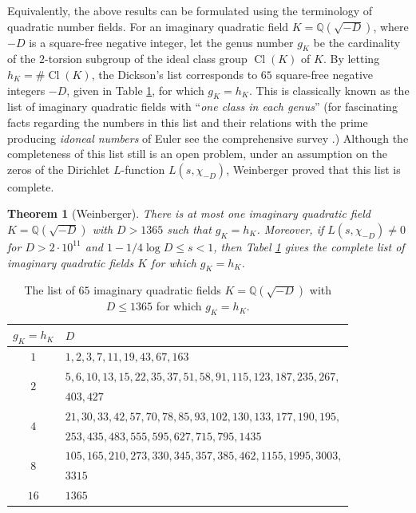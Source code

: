 \documentclass[12pt]{amsart}
\newtheorem{theorem}{Theorem}[section]
\theoremstyle{definition}
\numberwithin{equation}{section}
\DeclareMathOperator{\Cl}{Cl}
\begin{document}
Equivalently, the above results can be formulated using the terminology of quadratic number fields. For an imaginary quadratic field $K=\mathbb{Q}(\sqrt{-D})$, where $-D$ is a square-free negative integer, let the genus number $g_K$ be the cardinality of the $2$-torsion subgroup of the ideal class group $\Cl(K)$ of $K$. By letting $h_K=\#\Cl(K)$, the Dickson's list \cite[pp. 88-89]{Dickson} corresponds to $65$ square-free negative integers $-D$, given in Table \ref{table, classification imagianry quadratic}, for which $g_K=h_K$.
This is classically known as the list of imaginary quadratic fields with ``\emph{one class in each genus}'' (for fascinating facts regarding the numbers in this list and their relations with the prime producing \emph{idoneal numbers} of Euler see the comprehensive survey  \cite{Kani}.) 
Although the completeness of this list still is an open problem, under an assumption on the zeros of the Dirichlet $L$-function $L(s, \chi_{-D})$, 
Weinberger \cite[Thoeorem 1]{Weinberger} proved that this list is complete.

\begin{theorem}[{Weinberger}] \label{theorem, Weinberger}
There is at most one imaginary quadratic field $K=\mathbb{Q}(\sqrt{-D})$ with $D>1365$ such that $g_K=h_K$. Moreover, if $L(s, \chi_{-D})\neq 0$ for $D>2\cdot 10^{11}$ and $1-1/4\log{D} \leq s<1$, then Tabel \ref{table, classification imagianry quadratic} gives the complete list of imaginary quadratic fields $K$ for which $g_K=h_K$. 
\end{theorem}

\begin{table}[!h]
	\begin{center}
		\begin{tabular}{|c|p{10.1cm}|} 
			\hline
			$g_K=h_K$ & $D$   \\ [0.5ex] 
			\hline \hline
			$1$ & $1,2,3,7,11,19,43,67,163$ \\
			\hline 
			\multirow{2}{0.6em}{$2$} & $5,6,10,13,15,22,35,37,51,58,91,115,123,187,235,267,$ \\ 
			& $403,427$ \\
			\hline
			\multirow{2}{0.6em}{$4$} & $21,30,33,42,57,70,78,85,93,102,130,133,177,190,195,$ \\ 
			& $253,435,483,555,595,627,715,795,1435$ \\
			\hline
			\multirow{2}{0.6em}{$8$} & $105,165,210,273,330,345,357,385,462,1155,1995,3003,$ \\
			& $3315$ \\ \hline
			$16$ & $1365$ \\ \hline
		\end{tabular} \caption{The list of $65$  imaginary quadratic fields $K=\mathbb{Q}(\sqrt{-D})$ with $D \leq 1365$ for which $g_K=h_K$.
		} \label{table, classification imagianry quadratic}
	\end{center}
\end{table}
\end{document}
